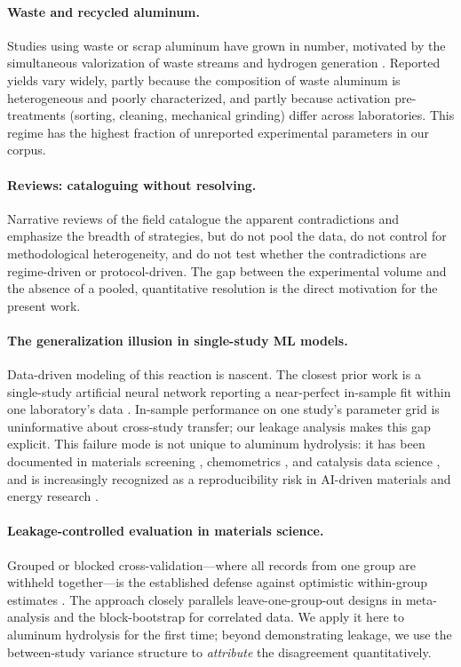 \paragraph{Waste and recycled aluminum.}
Studies using waste or scrap aluminum have grown in number, motivated by the
simultaneous valorization of waste streams and hydrogen generation
\citep{gupta2025,ho2016,knoks2025,mezulis2023,martinezv2026,buryakov2023met,urbonav2024,fadhilah2023}.
Reported yields vary widely, partly because the composition of waste aluminum is
heterogeneous and poorly characterized, and partly because activation pre-treatments
(sorting, cleaning, mechanical grinding) differ across laboratories. This regime has the
highest fraction of unreported experimental parameters in our corpus.

\paragraph{Reviews: cataloguing without resolving.}
Narrative reviews of the field
\citep{musicco2025,dupreez2021review} catalogue the apparent contradictions and
emphasize the breadth of strategies, but do not pool the data, do not control for
methodological heterogeneity, and do not test whether the contradictions are regime-driven
or protocol-driven. The gap between the experimental volume and the absence of a pooled,
quantitative resolution is the direct motivation for the present work.

\paragraph{The generalization illusion in single-study ML models.}
Data-driven modeling of this reaction is nascent. The closest prior work is a single-study
artificial neural network reporting a near-perfect in-sample fit within one laboratory's
data \citep{das2023fuel}. In-sample performance on one study's parameter grid is
uninformative about cross-study transfer; our leakage analysis makes this gap explicit.
This failure mode is not unique to aluminum hydrolysis: it has been documented in materials
screening \citep{bernett2024,john2025}, chemometrics \citep{pomerantsev2021}, and catalysis
data science \citep{suvarna2024}, and is increasingly recognized as a reproducibility risk
in AI-driven materials and energy research \citep{bozalginesta2025,coelho2022,xue2024,noble2022}.

\paragraph{Leakage-controlled evaluation in materials science.}
Grouped or blocked cross-validation---where all records from one group are withheld
together---is the established defense against optimistic within-group estimates
\citep{bernett2024,john2025}. The approach closely parallels leave-one-group-out designs
in meta-analysis and the block-bootstrap for correlated data. We apply it here to
aluminum hydrolysis for the first time; beyond demonstrating leakage, we use the
between-study variance structure to \emph{attribute} the disagreement quantitatively.

